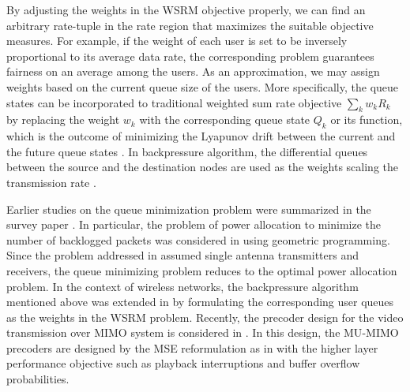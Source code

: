 By adjusting the weights in the \ac{WSRM} objective properly, we can find an arbitrary rate-tuple in the rate region that maximizes the suitable objective measures. For example, if the weight of each user is set to be inversely proportional to its average data rate, the corresponding problem guarantees fairness on an average among the users. As an approximation, we may assign weights based on the current queue size of the users. More specifically, the queue states can be incorporated to traditional weighted sum rate objective $\sum_k w_k R_k$ by replacing the weight $w_k$ with the corresponding queue state $Q_k$ or its function, which is the outcome of minimizing the Lyapunov drift between the current and the future queue states \cite{tassiulas,neely2010stochastic}. In backpressure algorithm, the differential queues between the source and the destination nodes are used as the weights scaling the transmission rate \cite{georgiadis2006resource}.

Earlier studies on the queue minimization problem were summarized in the survey paper \cite{berry2004cross,layering_as_opt}. In particular, the problem of power allocation to minimize the number of backlogged packets was considered in \cite{qps_cioffi} using geometric programming. Since the problem addressed in \cite{qps_cioffi} assumed single antenna transmitters and receivers, the queue minimizing problem reduces to the optimal power allocation problem. In the context of wireless networks, the backpressure algorithm mentioned above was extended in \cite{weeraddana2011resource} by formulating the corresponding user queues as the weights in the \ac{WSRM} problem. Recently, the precoder design for the video transmission over \ac{MIMO} system is considered in \cite{video_queues}. In this design, the \ac{MU}-\ac{MIMO} precoders are designed by the \ac{MSE} reformulation as in \cite{christensen2008weighted} with the higher layer performance objective such as playback interruptions and buffer overflow probabilities.

